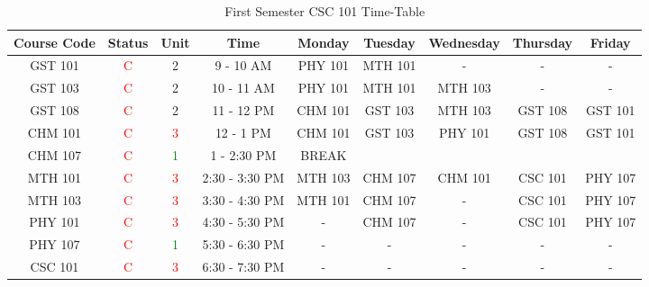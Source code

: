 \documentclass{article}
\begin{document}
	\begin{sidewaystable}[h!]
		\begin{center}
			\caption{First Semester CSC 101 Time-Table}
			\label{tab:table1}
			\vline \begin{tabular}{c|c|c|c|c|c|c|c|c}
				\hline
				\cellcolor{purple!20}\textbf{Course Code} & \cellcolor{purple!20}\textbf{Status} & \cellcolor{purple!20}\textbf{Unit} & \cellcolor{purple!20}\textbf{Time} & \cellcolor{pink!20}\textbf{Monday}& \cellcolor{pink!20}\textbf{Tuesday }& \cellcolor{pink!20}\textbf{Wednesday}& \cellcolor{pink!20}\textbf{Thursday} & \cellcolor{pink!20}\textbf{Friday}\\
				\hline
				\cellcolor{purple!40}GST 101 & \textcolor{red}C & \textcolor{red!50}2 & 9 - 10 AM & PHY 101 & MTH 101 & - & - & - \\
				\cellcolor{purple!40}GST 103 & \textcolor{red}C & \textcolor{red!50}2 & 10 - 11 AM & PHY 101 & MTH 101 & MTH 103 & - & - \\
				\cellcolor{purple!40}GST 108 & \textcolor{red}C & \textcolor{red!50}2 & 11 - 12 PM & CHM 101 & GST 103 & MTH 103 & GST 108 & GST 101 \\
				\cellcolor{purple!40}CHM 101 & \textcolor{red}C & \textcolor{red}3 & 12 - 1 PM & CHM 101 & GST 103 & PHY 101 & GST 108 & GST 101 \\
				\hline
				\cellcolor{purple!40}CHM 107 & \textcolor{red}C & \textcolor{green}1 & 1 - 2:30 PM & \cellcolor{pink!20}BREAK & \cellcolor{pink!20} & \cellcolor{pink!20} & \cellcolor{pink!20} & \cellcolor{pink!20}\\
				\hline
				\cellcolor{purple!40}MTH 101 & \textcolor{red}C & \textcolor{red}3 & 2:30 - 3:30 PM & MTH 103 & CHM 107 & CHM 101 & CSC 101 & PHY 107 \\
				\cellcolor{purple!40}MTH 103 & \textcolor{red}C & \textcolor{red}3 & 3:30 - 4:30 PM & MTH 101 & CHM 107 & - & CSC 101 & PHY 107 \\
				\cellcolor{purple!40}PHY 101 & \textcolor{red}C & \textcolor{red}3 & 4:30 - 5:30 PM & - & CHM 107 & - & CSC 101 & PHY 107 \\
				\cellcolor{purple!40}PHY 107 & \textcolor{red}C & \textcolor{green}1 & 5:30 - 6:30 PM & - & - & - & - & - \\
				\cellcolor{purple!40}CSC 101 & \textcolor{red}C & \textcolor{red}3 & 6:30 - 7:30 PM & - & - & - & - & - \\
				\hline  
			\end{tabular} 
		\end{center}
	\end{sidewaystable}
\end{document}
